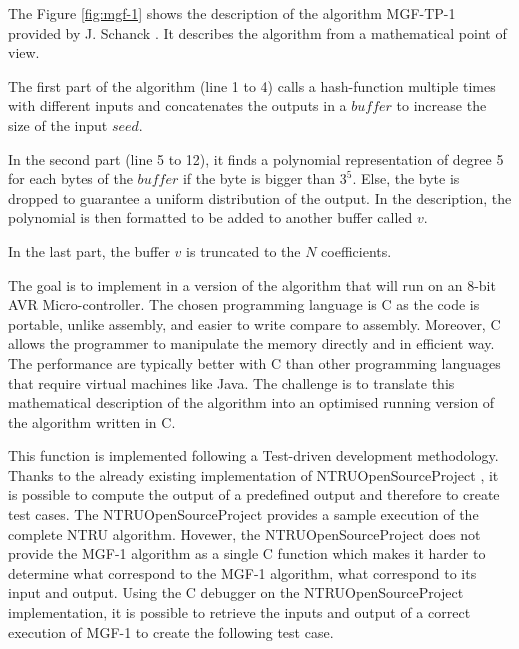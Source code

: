 The Figure \ref{fig:mgf-1} shows the description of the algorithm MGF-TP-1 provided by J. Schanck \cite{schanck_practical_2015}. It describes the algorithm from a mathematical point of view. 

The first part of the algorithm (line 1 to 4) calls a hash-function multiple times with different inputs and concatenates the outputs in a $buffer$ to increase the size of the input $seed$.

In the second part (line 5 to 12), it finds a polynomial representation of degree 5 for each bytes of the $buffer$ if the byte is bigger than $3^5$. Else, the byte is dropped to guarantee a uniform distribution of the output. In the description, the polynomial is then formatted to be added to another buffer called $v$.

In the last part, the buffer $v$ is truncated to the $N$ coefficients.

The goal is to implement in a version of the algorithm that will run on an 8-bit AVR Micro-controller. The chosen programming language is C as the code is portable, unlike assembly, and easier to write compare to assembly. Moreover, C allows the programmer to manipulate the memory directly and in efficient way. The performance are typically better with C than other programming languages that require virtual machines like Java. 
The challenge is to translate this mathematical description of the algorithm into an optimised running version of the algorithm written in C.

This function is implemented following a Test-driven development methodology. Thanks to the already existing implementation of NTRUOpenSourceProject \cite{noauthor_open_2018}, it is possible to compute the output of a predefined output and therefore to create test cases. The NTRUOpenSourceProject provides a sample execution of the complete NTRU algorithm. Hovewer, the NTRUOpenSourceProject does not provide the MGF-1 algorithm as a single C function which makes it harder to determine what correspond to the MGF-1 algorithm, what correspond to its input and output. Using the C debugger on the NTRUOpenSourceProject implementation, it is possible to retrieve the inputs and output of a correct execution of MGF-1 to create the following test case.

